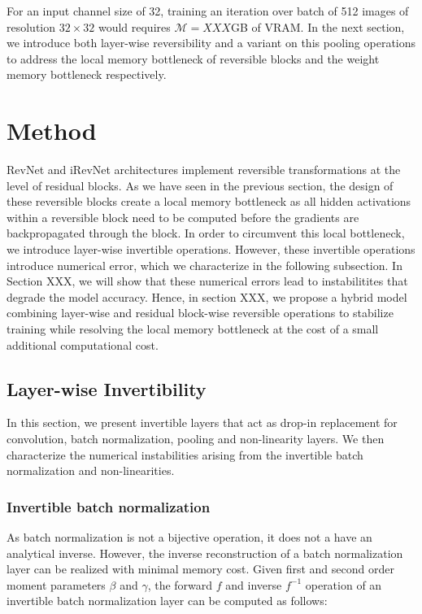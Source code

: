\documentclass[twocolumn]{bmcart}
\begin{document}
For an input channel size of 32, training an iteration over batch of 512 images of resolution $32 \times 32$ would requires $\mathcal{M}=XXX$GB of VRAM. 
In the next section, we introduce both layer-wise reversibility and a variant on this pooling operations to address the local memory bottleneck of reversible blocks and the weight memory bottleneck respectively.

\section{Method}

RevNet and iRevNet architectures implement reversible transformations at the level of residual blocks. 
As we have seen in the previous section, the design of these reversible blocks create a local memory bottleneck as all hidden activations within a reversible block need to be computed before the gradients are backpropagated through the block. 
In order to circumvent this local bottleneck, we introduce layer-wise invertible operations. 
However, these invertible operations introduce numerical error, which we characterize in the following subsection. 
In Section XXX, we will show that these numerical errors lead to instabilitites that degrade the model accuracy. 
Hence, in section XXX, we propose a hybrid model combining layer-wise and residual block-wise reversible operations to stabilize training while resolving the local memory bottleneck at the cost of a small additional computational cost.

\subsection{Layer-wise Invertibility}

In this section, we present invertible layers that act as drop-in replacement for convolution, batch normalization, pooling and non-linearity layers. We then characterize the numerical instabilities arising from the invertible batch normalization and non-linearities.

\subsubsection{Invertible batch normalization}

As batch normalization is not a bijective operation, it does not a have an analytical inverse.
However, the inverse reconstruction of a batch normalization layer can be realized with minimal memory cost.
Given first and second order moment parameters $\beta$ and $\gamma$, the forward $f$ and inverse $f^{-1}$ operation of an invertible batch normalization layer can be computed as follows:
\end{document}
